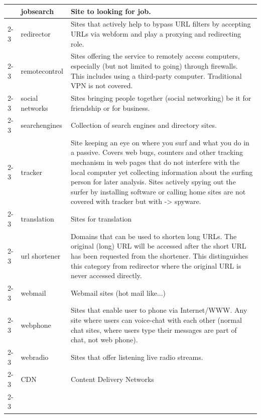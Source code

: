 \begin{longtable}{p{}|p{}|p{}}
                              & jobsearch & Site to looking for job.\\ \cline{2-3} 
                              & redirector & Sites that actively help to bypass URL filters by accepting URLs via webform and play a proxying and redirecting role. \\ \cline{2-3} 
                              & remotecontrol & Sites offering the service to remotely access computers, especially (but not limited to going) through firewalls. This includes using a third-party computer. Traditional VPN is not covered.\\ \cline{2-3} 
                              & social networks & Sites bringing people together (social networking) be it for friendship or for business.  \\ \cline{2-3}
                              & searchengines & Collection of search engines and directory sites.\\ \cline{2-3}
                              & tracker & Site keeping an eye on where you surf and what you do in a passive. Covers web bugs, counters and other tracking mechanism in web pages that do not interfere with the local computer yet collecting information about the surfing person for later analysis. Sites actively spying out the surfer by installing software or calling home sites are not covered with tracker but with -> spyware.\\ \cline{2-3} 
                              & translation & Sites for translation\\ \cline{2-3}
                              & url shortener & Domains that can be used to shorten long URLs. The original (long) URL will be accessed after the short URL has been requested from the shortener. This distinguishes this category from redirector where the original URL is never accessed directly.\\ \cline{2-3} 
                              & webmail & Webmail sites (hot mail like...)\\ \cline{2-3}
                              & webphone & Sites that enable user to phone via Internet/WWW. Any site where users can voice-chat with each other (normal chat sites, where users type their messages are part of chat, not web phone).\\ \cline{2-3}
                              & webradio & Sites that offer listening live radio streams.\\ \cline{2-3}
                              & CDN & Content Delivery Networks\\ \cline{2-3}

\end{longtable}

